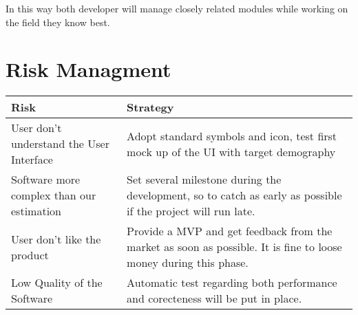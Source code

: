 \documentclass[11pt]{article} %
\begin{document}
In this way both developer will manage closely related modules while working on the field they know best.

\begin{comment}
L = 3
A = 4
H = 6

USER -> 11
GEOLOCATION -> 15
POSITION ->10
BOOKING -> 10
CAR -> 25
RIDE -> 6 + 3
ISSUE -> 13
BILL -> 13
NOTIFY -> 5

SIMO -> GEOLOCATION + POSITION + CAR + RIDE = 15 + 10 + 25 + 9 = 59
SARA -> USER + BOOKING + ISSUE + BILL + NOTIFY = 11 + 10 + 13 + 13 + 5 = 52
\end{comment}

\section{Risk Managment}

\begin{table}[h]
\begin{tabularx}{\textwidth}{ | X | X | } \hline
Risk & Strategy \\ \hline \hline
User don't understand the User Interface & Adopt standard symbols and icon, test first mock up of the UI with target demography \\ \hline
Software more complex than our estimation & Set several milestone during the development, so to catch as early as possible if the project will run late. \\ \hline
User don't like the product & Provide a MVP and get feedback from the market as soon as possible. It is fine to loose money during this phase. \\ \hline
Low Quality of the Software & Automatic test regarding both performance and corecteness will be put in place. \\ \hline
\end{tabularx}
\end{table}
\end{document}
